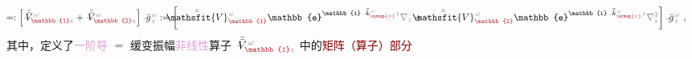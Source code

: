 \begin{subequations}
\begin{align}
	\!\!\! &=: \left[ \xint{\mathcolor{gray}{-}}{25}{\bar{\bar{V}}}^{\;\! \mathcolor{gray}{\omega}}_{\textcolor{Maroon}{\mathbb{1}} \mathcolor{gray}{z} } + \xint{\mathcolor{gray}{-}}{25}{\bar{\bar{V}}}^{\;\! \mathcolor{gray}{\omega}}_{\textcolor{Maroon}{\mathbb{2}} \mathcolor{gray}{z} } \right] \xint{{}^{}_{\mathcolor{gray}{-}}}{10}{\bar{g}}^{\;\!\mathcolor{gray}{\omega}}_{\;\! \mathcolor{gray}{z}} := \left[ \xint{\mathcolor{gray}{-}}{25}{\bar{\bar{\mathsfit{V}}}}^{\;\! \mathcolor{gray}{\omega}}_{\textcolor{Maroon}{\mathbb{1}}} \mathbb{e}^{\mathbb{i} \xint{\begin{smallmatrix} ~ \\ {}^{}_{\mathcolor{gray}{-}} \\ ~ \end{smallmatrix}}{15}{\bar{\bar{k}}}_{\textcolor{Maroon}{\symup{z}}}^{\;\! \mathcolor{gray}{\omega}} \mathcolor{gray}{z}} \mathcolor{gray}{\nabla_z} + \xint{\mathcolor{gray}{-}}{25}{\bar{\bar{\mathsfit{V}}}}^{\;\! \mathcolor{gray}{\omega}}_{\textcolor{Maroon}{\mathbb{2}}} \mathbb{e}^{\mathbb{i} \xint{\begin{smallmatrix} ~ \\ {}^{}_{\mathcolor{gray}{-}} \\ ~ \end{smallmatrix}}{15}{\bar{\bar{k}}}_{\textcolor{Maroon}{\symup{z}}}^{\;\! \mathcolor{gray}{\omega}} \mathcolor{gray}{z}} \mathcolor{gray}{\nabla_z^2} \right] \xint{{}^{}_{\mathcolor{gray}{-}}}{10}{\bar{g}}^{\;\!\mathcolor{gray}{\omega}}_{\;\! \mathcolor{gray}{z}} ~, \label{eq:matrix_exp_eq-left_V-1st2nd-decompose}
\end{align}
\end{subequations}
其中，定义了\textcolor{Plum}{一阶导} $=$ \textcolor{NavyBlue}{缓变振幅}\textcolor{Plum}{非线性}算子 $\xint{\mathcolor{gray}{-}}{21}{\bar{\bar{V}}}^{\;\! \mathcolor{gray}{\omega}}_{\textcolor{Maroon}{\mathbb{1}} \mathcolor{gray}{z} }$ 中的\textcolor{Maroon}{矩阵（算子）部分}
